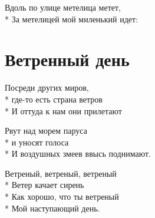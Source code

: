 \medskip

\begin{minipage}{\linewidth}
Вдоль по улице метелица метет,\\*
За метелицей мой миленький идет:\\
\end{minipage}

\vspace{\fill}\newpage

\section{Ветренный день}
\label{song:Ветренный_день}

\medskip

\begin{minipage}{\linewidth}
Посреди других миров,\\*
где-то есть страна ветров\\*
И оттуда к нам они прилетают\\
\end{minipage}\par\medskip\nobreak

\medskip

\begin{minipage}{\linewidth}
Рвут над морем паруса\\*
и уносят голоса\\*
И воздушных змеев ввысь поднимают.\\
\end{minipage}\par\medskip\nobreak

\medskip

\begin{minipage}{\linewidth}
\hspace*{1.5em}Ветреный, ветреный, ветреный\\*
\hspace*{1.5em}Ветер качает сирень\\*
\hspace*{1.5em}Как хорошо, что ты ветреный\\*
\hspace*{1.5em}Мой наступающий день.\\
\end{minipage}\par\medskip\nobreak

